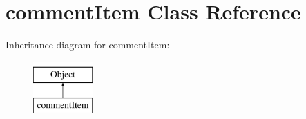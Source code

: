 \hypertarget{classcommentItem}{}\section{comment\+Item Class Reference}
\label{classcommentItem}
Inheritance diagram for comment\+Item\+:\begin{figure}[H]
\begin{center}
\leavevmode
\includegraphics[height=2.000000cm]{classcommentItem}
\end{center}
\end{figure}
